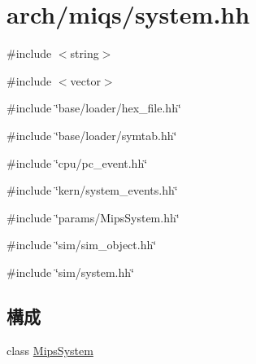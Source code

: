 \hypertarget{arch_2miqs_2system_8hh}{
\section{arch/miqs/system.hh}
\label{arch_2miqs_2system_8hh}
}
{\ttfamily \#include $<$string$>$}\par
{\ttfamily \#include $<$vector$>$}\par
{\ttfamily \#include \char`\"{}base/loader/hex\_\-file.hh\char`\"{}}\par
{\ttfamily \#include \char`\"{}base/loader/symtab.hh\char`\"{}}\par
{\ttfamily \#include \char`\"{}cpu/pc\_\-event.hh\char`\"{}}\par
{\ttfamily \#include \char`\"{}kern/system\_\-events.hh\char`\"{}}\par
{\ttfamily \#include \char`\"{}params/MipsSystem.hh\char`\"{}}\par
{\ttfamily \#include \char`\"{}sim/sim\_\-object.hh\char`\"{}}\par
{\ttfamily \#include \char`\"{}sim/system.hh\char`\"{}}\par
\subsection*{構成}
\begin{DoxyCompactItemize}
\item 
class \hyperlink{classMipsSystem}{MipsSystem}
\end{DoxyCompactItemize}
